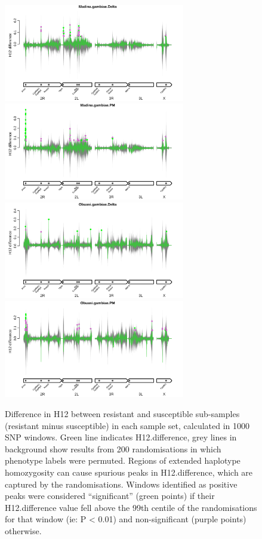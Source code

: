 \documentclass[a4paper,12pt]{article}
\begin{document}
\begin{figure}[h]
	\vskip 0.4cm
	\includegraphics*[width = 7.9cm]{../../randomisations/H12/Madina.gambiae.Delta_peak_filter_plot.png}
	\includegraphics*[width = 7.9cm]{../../randomisations/H12/Madina.gambiae.PM_peak_filter_plot.png}
	\vskip 0.4cm
	\includegraphics*[width = 7.9cm]{../../randomisations/H12/Obuasi.gambiae.Delta_peak_filter_plot.png}
	\includegraphics*[width = 7.9cm]{../../randomisations/H12/Obuasi.gambiae.PM_peak_filter_plot.png}
	\caption{\footnotesize Difference in H12 between resistant and susceptible sub-samples (resistant minus susceptible) in each sample set, calculated in 1000 SNP windows. Green line indicates H12.difference, grey lines in background show results from 200 randomisations in which phenotype labels were permuted. Regions of extended haplotype homozygosity can cause spurious peaks in H12.difference, which are captured by the randomisations. Windows identified as positive peaks were considered ``significant'' (green points) if their H12.difference value fell above the 99th centile of the randomisations for that window (ie: P < 0.01) and non-significant (purple points) otherwise.}
	\label{FigS6}
\end{figure}
\end{document}
